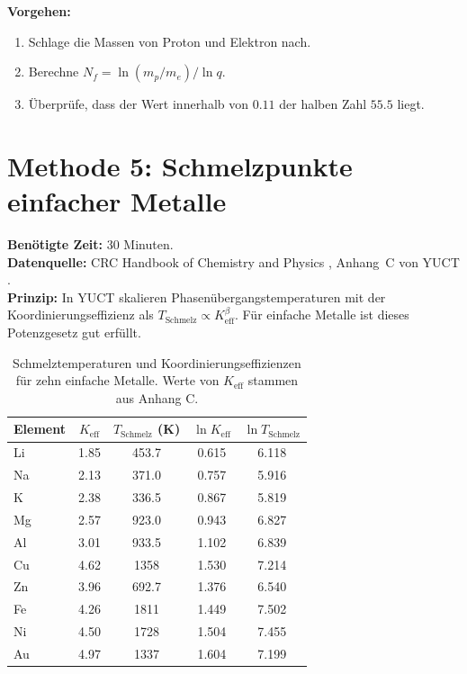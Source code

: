 \documentclass[12pt,a4paper]{article}
\newcommand{\Ke}{K_{\mathrm{eff}}}
\begin{document}
	\textbf{Vorgehen:}
	\begin{enumerate}[label=(\arabic*)]
		\item Schlage die Massen von Proton und Elektron nach.
		\item Berechne \(N_f = \ln(m_p / m_e) / \ln q\).
		\item Überprüfe, dass der Wert innerhalb von \(0.11\) der halben Zahl \(55.5\) liegt.
	\end{enumerate}
	
	\section{Methode 5: Schmelzpunkte einfacher Metalle}
	\label{sec:melting}
	
	\textbf{Benötigte Zeit:} 30 Minuten.\\
	\textbf{Datenquelle:} CRC Handbook of Chemistry and Physics \cite{CRC},
	Anhang~C von YUCT \cite{AppendixC}.\\
	\textbf{Prinzip:} In YUCT skalieren Phasenübergangstemperaturen mit der
	Koordinierungseffizienz als \(T_{\text{Schmelz}} \propto \Ke^{\beta}\). Für
	einfache Metalle ist dieses Potenzgesetz gut erfüllt.
	
	\begin{table}[H]
		\centering
		\caption{Schmelztemperaturen und Koordinierungseffizienzen für zehn
			einfache Metalle. Werte von \(\Ke\) stammen aus Anhang C.}
		\label{tab:melting}
		\begin{tabular}{l c c c c}
			\toprule
			Element & \(\Ke\) & \(T_{\text{Schmelz}}\) (K) & \(\ln \Ke\) & \(\ln T_{\text{Schmelz}}\) \\
			\midrule
			Li & 1.85 & 453.7 & 0.615 & 6.118 \\
			Na & 2.13 & 371.0 & 0.757 & 5.916 \\
			K  & 2.38 & 336.5 & 0.867 & 5.819 \\
			Mg & 2.57 & 923.0 & 0.943 & 6.827 \\
			Al & 3.01 & 933.5 & 1.102 & 6.839 \\
			Cu & 4.62 & 1358  & 1.530 & 7.214 \\
			Zn & 3.96 & 692.7 & 1.376 & 6.540 \\
			Fe & 4.26 & 1811  & 1.449 & 7.502 \\
			Ni & 4.50 & 1728  & 1.504 & 7.455 \\
			Au & 4.97 & 1337  & 1.604 & 7.199 \\
			\bottomrule
		\end{tabular}
	\end{table}
	
\end{document}
